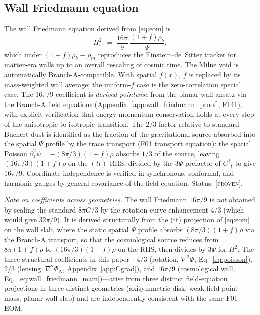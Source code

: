 \documentclass[aps,prd,twocolumn,nofootinbib,floatfix,superscriptaddress]{revtex4-2}
\newcommand{\PROVEN}{{\color{black!75!green}\textsc{[proven]}}}
\begin{document}
\subsection{Wall Friedmann equation}
\label{sec:wall_friedmann}

The wall Friedmann equation derived from \eqref{eq:eom} is
\begin{equation}
\label{eq:wall_friedmann_main}
H_w^2 \;=\; \frac{16\pi}{9}\,\frac{(1+f)\rho_b}{\Psi},
\end{equation}
which under $(1+f)\rho_b\equiv\rho_m$ reproduces the
Einstein--de~Sitter tracker for matter-era walls up to an overall
rescaling of cosmic time. The Milne void is automatically
Branch-A-compatible. With spatial $f(x)$, $f$ is replaced by its
mass-weighted wall average; the uniform-$f$ case is the
zero-correlation special case. The $16\pi/9$ coefficient is
\emph{derived pointwise} from the planar wall ansatz via the
Branch-A field equations
(Appendix~\ref{app:wall_friedmann_proof}, F141), with explicit
verification that energy-momentum conservation holds at every step
of the anisotropic-to-isotropic transition. The $2/3$ factor relative
to standard Buchert dust is identified as the fraction of the
gravitational source absorbed into the spatial $\Psi$ profile by
the trace transport (F01 transport equation): the spatial Poisson
$\partial_z^2\psi = -(8\pi/3)(1{+}f)\rho$ absorbs $1/3$ of the source,
leaving $(16\pi/3)(1{+}f)\rho$ on the $(tt)$ RHS, divided by the
$3\Psi$ prefactor of $G^t{}_t$ to give $16\pi/9$.
Coordinate-independence is verified in synchronous, conformal, and
harmonic gauges by general covariance of the field equation.
Status: \PROVEN.

\emph{Note on coefficients across geometries.} The wall Friedmann
$16\pi/9$ is \emph{not} obtained by scaling the standard
$8\pi G/3$ by the rotation-curve enhancement $4/3$ (which would give
$32\pi/9$). It is derived structurally from the (tt) projection of
\eqref{eq:eom} on the wall slab, where the static spatial $\Psi$
profile absorbs $(8\pi/3)(1{+}f)\rho$ via the Branch-A transport, so
that the cosmological source reduces from $8\pi(1{+}f)\rho$ to
$(16\pi/3)(1{+}f)\rho$ on the RHS, then divides by $3\Psi$ for $H^2$.
The three structural coefficients in this paper---$4/3$ (rotation,
$\nabla^2\Phi$, Eq.~\ref{eq:poisson}), $2/3$ (lensing,
$\nabla^2\Phi_N$, Appendix~\ref{app:Cgrad}), and $16\pi/9$
(cosmological wall, Eq.~\ref{eq:wall_friedmann_main})---arise from
three distinct field-equation projections in three distinct
geometries (axisymmetric disk, weak-field point mass, planar wall
slab) and are independently consistent with the same F01 EOM.
\end{document}
